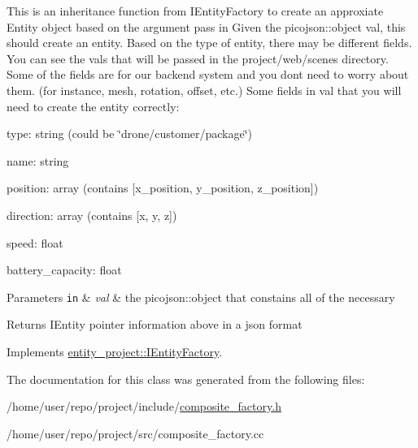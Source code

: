This is an inheritance function from I\+Entity\+Factory to create an approxiate Entity object based on the argument pass in Given the picojson\+::object val, this should create an entity. Based on the type of entity, there may be different fields. You can see the vals that will be passed in the project/web/scenes directory. Some of the fields are for our backend system and you don\textquotesingle{}t need to worry about them. (for instance, mesh, rotation, offset, etc.) Some fields in val that you will need to create the entity correctly\+: 

type\+: string (could be \char`\"{}drone/customer/package\char`\"{})

name\+: string

position\+: array (contains \mbox{[}x\+\_\+position, y\+\_\+position, z\+\_\+position\mbox{]})

direction\+: array (contains \mbox{[}x, y, z\mbox{]})

speed\+: float

battery\+\_\+capacity\+: float 
\begin{DoxyParams}[1]{Parameters}
\mbox{\tt in}  & {\em val} & the picojson\+::object that constains all of the necessary \\
\hline
\end{DoxyParams}
\begin{DoxyReturn}{Returns}
I\+Entity pointer information above in a json format 
\end{DoxyReturn}


Implements \hyperlink{classentity__project_1_1IEntityFactory_ac4e8eaf4294958fef0b98bd3684704bb}{entity\+\_\+project\+::\+I\+Entity\+Factory}.



The documentation for this class was generated from the following files\+:\begin{DoxyCompactItemize}
\item 
/home/user/repo/project/include/\hyperlink{composite__factory_8h}{composite\+\_\+factory.\+h}\item 
/home/user/repo/project/src/composite\+\_\+factory.\+cc\end{DoxyCompactItemize}
